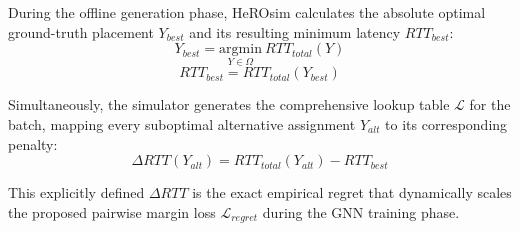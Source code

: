 \documentclass[11pt]{article}
\begin{document}
During the offline generation phase, HeROsim calculates the absolute optimal ground-truth placement $Y_{best}$ and its resulting minimum latency $RTT_{best}$:
\begin{equation}
Y_{best} = \underset{Y \in \Omega}{\mathrm{argmin}} \ RTT_{total}(Y)
\end{equation}
\begin{equation}
RTT_{best} = RTT_{total}(Y_{best})
\end{equation}

Simultaneously, the simulator generates the comprehensive lookup table $\mathcal{L}$ for the batch, mapping every suboptimal alternative assignment $Y_{alt}$ to its corresponding penalty:
\begin{equation}
\Delta RTT(Y_{alt}) = RTT_{total}(Y_{alt}) - RTT_{best}
\end{equation}

This explicitly defined $\Delta RTT$ is the exact empirical regret that dynamically scales the proposed pairwise margin loss $\mathcal{L}_{regret}$ during the GNN training phase.
\end{document}
